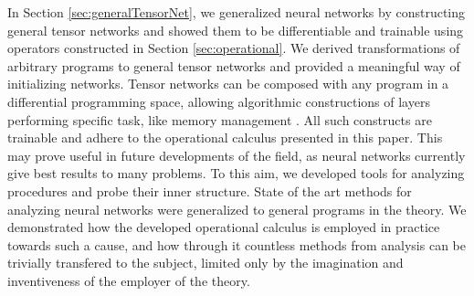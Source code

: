 \documentclass[smallcondensed]{svjour3}
\begin{document}
In Section \ref{sec:generalTensorNet}, we generalized neural networks by constructing general tensor networks and showed them to be differentiable and trainable using operators constructed in Section \ref{sec:operational}. We derived transformations of arbitrary programs to general tensor networks and provided a meaningful way of initializing networks. Tensor networks can be composed with any program in a differential programming space, allowing algorithmic constructions of layers performing specific task, like memory management \cite{LSTM}\cite{netRam}. All such constructs are trainable and adhere to the operational calculus presented in this paper. 
This may prove useful in future developments of the field, as neural networks currently give best results to many problems. To this aim, we developed tools for analyzing procedures and probe their inner structure.
State of the art methods for analyzing neural networks were generalized to general programs in the theory.
We demonstrated how the developed operational calculus is employed in practice towards such a cause, and how through it countless methods from analysis can be trivially transfered to the subject, limited only by the imagination and inventiveness of the employer of the theory.

\nocite{*}

\end{document}
